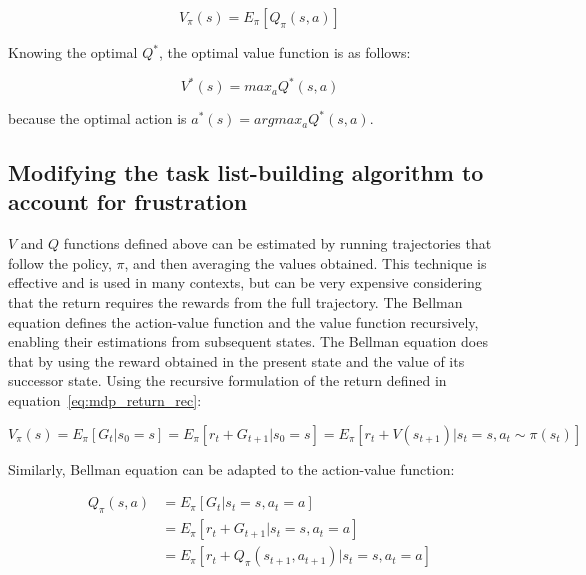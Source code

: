 \begin{itemize}
    \begin{equation} \label{eq:mdp_value_action_value}
        V_\pi(s) = E_\pi[Q_\pi(s, a)]
    \end{equation}

    Knowing the optimal $Q^*$, the optimal value function is as follows:

    \begin{equation} \label{eq:mdp_optimal_value}
        V^*(s) = max_a Q^* (s, a)
    \end{equation}

    because the optimal action is $ a^* (s) = argmax_a Q^* (s, a) $.

\end{itemize}

\subsection{Modifying the task list-building algorithm to account for frustration} \label{subsec:q4_frustration_algorithm}

$V$ and $Q$ functions defined above can be estimated by running trajectories that follow the policy, $\pi$, and then averaging the values obtained.
This technique is effective and is used in many contexts, but can be very expensive considering that the return requires the rewards from the full trajectory.
The Bellman equation defines the action-value function and the value function recursively, enabling their estimations from subsequent states.
The Bellman equation does that by using the reward obtained in the present state and the value of its successor state.
Using the recursive formulation of the return defined in equation~\ref{eq:mdp_return_rec}:

\begin{equation} \label{eq:bellman_value}
    V_\pi(s) = E_\pi [G_t | s_0 = s]
    = E_\pi [r_t + G_{t+1} | s_0 = s]
    = E_\pi [r_t + V(s_{t+1}) | s_t = s, a_t \sim \pi(s_t) ]
\end{equation}

Similarly, Bellman equation can be adapted to the action-value function:

\begin{equation} \label{eq:bellman_action_value}
    \begin{split}
        Q_\pi(s, a) & = E_\pi [G_t | s_t = s, a_t = a] \\
        & = E_\pi [r_t + G_{t+1}|s_t=s, a_t=a] \\
        & = E_\pi [r_t + Q_\pi(s_{t+1}, a_{t+1})|s_t=s, a_t=a]
    \end{split}
\end{equation}


